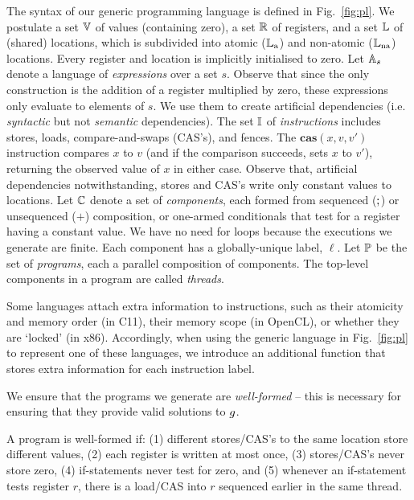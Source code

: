 The syntax of our generic programming language is defined in
Fig.~\ref{fig:pl}. We postulate a set $\mathbb{V}$ of values (containing
zero), a set $\mathbb{R}$ of registers, and a set $\mathbb{L}$ of (shared)
locations, which is subdivided into atomic ($\mathbb{L}_{\rm a}$) and non-atomic
($\mathbb{L}_{\rm na}$) locations. Every register and location is implicitly
initialised to zero. Let $\mathbb{A}_{s}$ denote a language of
\emph{expressions} over a set $s$. Observe that since the only
construction is the addition of a register multiplied by zero, these
expressions only evaluate to elements of $s$. We use them to create
artificial dependencies (i.e. \emph{syntactic} but not \emph{semantic}
dependencies). The set $\mathbb{I}$ of \emph{instructions} includes stores,
loads, compare-and-swaps (CAS's), and fences. The
$\mathbf{cas}(x,v,v')$ instruction compares $x$ to $v$ (and if the
comparison succeeds, sets $x$ to $v'$), returning the observed value
of $x$ in either case. Observe that, artificial dependencies
notwithstanding, stores and CAS's write only constant values to
locations. Let $\mathbb{C}$ denote a set of \emph{components}, each
formed from sequenced ($\mathbin{;}$) or unsequenced ($+$) composition, or
one-armed conditionals that test for a register having a constant
value. We have no need for loops because the executions we generate
are finite. Each component has a globally-unique label, $\ell$. Let
$\mathbb{P}$ be the set of \emph{programs}, each a parallel composition of
components. The top-level components in a program are called
\emph{threads}.

Some languages attach extra information to instructions, such as their
atomicity and memory order (in C11), their memory scope (in OpenCL),
or whether they are `locked' (in x86). Accordingly, when using the
generic language in Fig.~\ref{fig:pl} to represent one of these
languages, we introduce an additional function that stores extra
information for each instruction label.

We ensure that the programs we generate are \emph{well-formed} -- this
is necessary for ensuring that they provide valid solutions to
$g$.

\begin{definition}
\label{def:wf_prog} 
%
A program is well-formed if: (1) different stores/CAS's to the same
location store different values, (2) each register is written at most
once, (3) stores/CAS's never store zero, (4) if-statements never test
for zero, and (5) whenever an if-statement tests register $r$, there
is a load/CAS into $r$ sequenced earlier in the same thread.
%
\end{definition}

